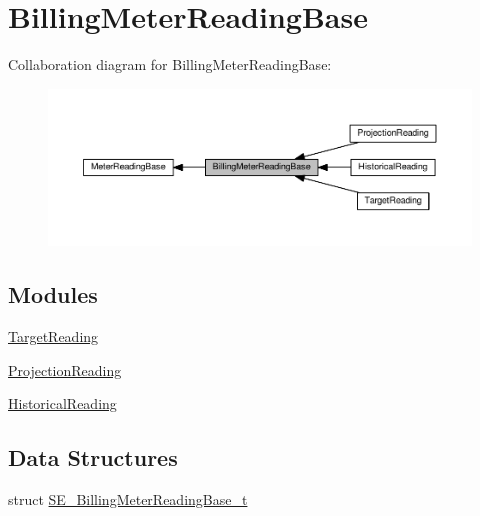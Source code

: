 \hypertarget{group__BillingMeterReadingBase}{}\section{Billing\+Meter\+Reading\+Base}
\label{group__BillingMeterReadingBase}
Collaboration diagram for Billing\+Meter\+Reading\+Base\+:\nopagebreak
\begin{figure}[H]
\begin{center}
\leavevmode
\includegraphics[width=350pt]{group__BillingMeterReadingBase}
\end{center}
\end{figure}
\subsection*{Modules}
\begin{DoxyCompactItemize}
\item 
\hyperlink{group__TargetReading}{Target\+Reading}
\item 
\hyperlink{group__ProjectionReading}{Projection\+Reading}
\item 
\hyperlink{group__HistoricalReading}{Historical\+Reading}
\end{DoxyCompactItemize}
\subsection*{Data Structures}
\begin{DoxyCompactItemize}
\item 
struct \hyperlink{structSE__BillingMeterReadingBase__t}{S\+E\+\_\+\+Billing\+Meter\+Reading\+Base\+\_\+t}
\end{DoxyCompactItemize}
